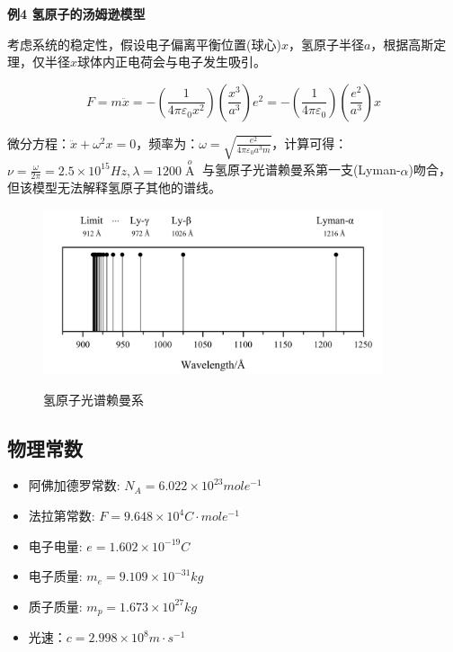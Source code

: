 {\bf 例4 氢原子的汤姆逊模型}

考虑系统的稳定性，假设电子偏离平衡位置(球心)$x$，氢原子半径$a$，根据高斯定理，仅半径$x$球体内正电荷会与电子发生吸引。

\begin{equation}
F = m\ddot x =  - \left( {\frac{1}{{4\pi \varepsilon _0 x^2 }}}
\right)\left( {\frac{{x^3 }}{{a^3 }}} \right)e^2  =  - \left(
{\frac{1}{{4\pi \varepsilon _0 }}} \right)\left( {\frac{{e^2
}}{{a^3 }}} \right)x
\end{equation}

微分方程：$\ddot x + \omega ^2 x = 0$，频率为：$\omega  = \sqrt
{\frac{{e^2 }}{{4\pi \varepsilon _0 a^3 m}}} $，计算可得：$\nu =
\frac{\omega }{{2\pi }} = 2.5 \times 10^{15} Hz,\lambda  =
1200\mathop A\limits^o $
与氢原子光谱赖曼系第一支(Lyman-$\alpha$)吻合，但该模型无法解释氢原子其他的谱线。

\begin{figure}[h]
\begin{center}
  \includegraphics[width=10cm]{AtomIdea/LymanSeries.png}\\
  \caption{氢原子光谱赖曼系}\label{Lyman Series for Hydrogen atom}
\end{center}
\end{figure}



\subsection*{物理常数}

\begin{itemize}
  \item 阿佛加德罗常数: $N_A= 6.022 \times 10^{23} mole^{-1}$
  \item 法拉第常数: $F=9.648 \times 10^4 C \cdot mole^{-1}$
  \item 电子电量: $e = 1.602 \times 10^{-19} C$
  \item 电子质量: $m_e =9.109 \times 10^{-31}kg$
  \item 质子质量: $m_p = 1.673 \times 10^{27} kg$
  \item 光速：$c = 2.998 \times 10^8 m \cdot s^{-1}$
\end{itemize}

